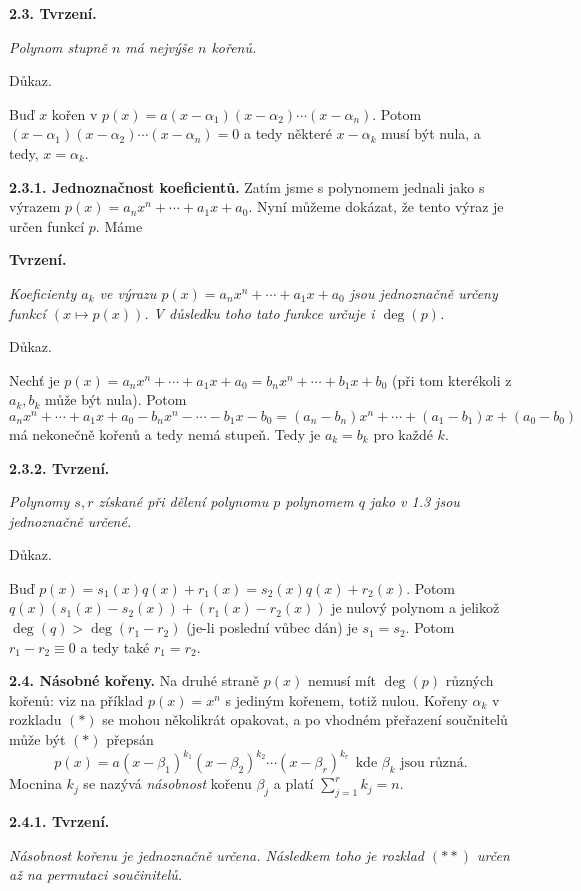 \documentclass[12pt]{article}
\begin{document}
{ \bigskip
 
 {\bf 2.3. Tvrzení.} {\em Polynom stupně $n$ má nejvýše $n$ kořenů.
 
 Důkaz.} Buď $x$ kořen v $p(x)=a(x-\alpha_1)(x-\alpha_2)\cdots(x-\alpha_n)$. Potom $(x-\alpha_1)(x-\alpha_2)\cdots(x-\alpha_n)=0$ a tedy některé $x-\alpha_k$ musí být nula, a tedy, $x=\alpha_k$.\sq
 
 \medskip
 
 {\bf 2.3.1. Jednoznačnost koeficientů.} Zatím jsme s polynomem jednali jako s výrazem
 $p(x)= a_nx^n+\cdots+a_1x+a_0$. Nyní můžeme dokázat, že tento výraz je určen funkcí $p$. Máme
 
 \medskip
 
 {\bf Tvrzení.} {\em Koeficienty $a_k$ ve výrazu $p(x)= a_nx^n+\cdots+a_1x+a_0$ jsou jednoznačně určeny
 funkcí $(x\mapsto p(x))$. V důsledku toho tato funkce určuje i $\deg (p)$.
 
 Důkaz.} Nechť je $p(x)= a_nx^n+\cdots+a_1x+a_0= b_nx^n+\cdots+b_1x+b_0$ (při tom kterékoli z $a_k,b_k$ může být nula). Potom
 $a_nx^n+\cdots+a_1x+a_0- b_nx^n-\cdots-b_1x-b_0=(a_n-b_n)x^n+\cdots+(a_1-b_1)x+(a_0-b_0)$ má nekonečně kořenů a tedy nemá stupeň. Tedy je $a_k=b_k$ pro každé $k$.\sq
 
 \medskip
 
 {\bf 2.3.2. Tvrzení.} {\em Polynomy $s,r$ získané při dělení polynomu $p$ polynomem $q$ jako v 1.3
 jsou jednoznačně určené.
 
 Důkaz.} Buď $p(x)=s_1(x)q(x)+r_1(x)=s_2(x)q(x)+r_2(x)$. Potom $q(x)(s_1(x)-s_2(x))+(r_1(x)-r_2(x))$ je nulový polynom a jeliko\v z $\deg(q)>\deg(r_1-r_2)$ (je-li poslední vůbec dán)  je $s_1=s_2$. Potom $r_1-r_2\equiv 0$ a tedy také $r_1=r_2$. \sq
 
 \bigskip
 
 {\bf 2.4. Násobné kořeny.} Na druhé straně $p(x)$ nemusí mít $\deg (p)$ různých kořenů: viz na příklad
 $p(x)=x^n$ s jediným kořenem, totiž nulou. Kořeny $\alpha_k$ v rozkladu $(*)$  se mohou několikrát opakovat, a po vhodném přeřazení součnitelů může být $(*)$ přepsán
 \begin{equation}
 p(x)=a(x-\beta_1)^{k_1}(x-\beta_2)^{k_2}\cdots(x-\beta_r)^{k_r} \ \ \text{kde $\beta_k$ jsou různá.} \tag{$**$}
 \end{equation}
 Mocnina $k_j$ se nazývá {\em násobnost} kořenu $\beta_j$ a platí $\sum_{j=1}^rk_j=n$.
 
 \medskip
 
 {\bf 2.4.1. Tvrzení.} {\em Násobnost kořenu je jednoznačně určena. Následkem toho je rozklad $(**)$ určen až na permutaci součinitelů.
 
}}
\end{document}
